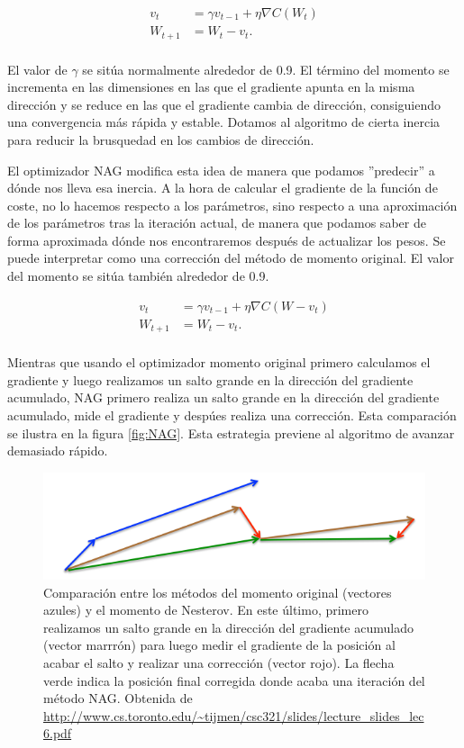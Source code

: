 \begin{align*}	
	v_t&= \gamma v_{t-1} + \eta \nabla C(W_t) \\
	W_{t+1} &= W_t- v_t. \\
\end{align*}

El valor de $\gamma$ se sitúa normalmente alrededor de 0.9. El término del momento se incrementa en las dimensiones en las que el gradiente apunta en la misma dirección y se reduce en las que el gradiente cambia de dirección, consiguiendo una convergencia más rápida y estable. Dotamos al algoritmo de cierta inercia para reducir la brusquedad en los cambios de dirección.

El optimizador NAG \cite{Nesterov} modifica esta idea de manera que podamos ''predecir'' a dónde nos lleva esa inercia. A la hora de calcular el gradiente de la función de coste, no lo hacemos respecto a los parámetros, sino respecto a una aproximación de los parámetros tras la iteración actual, de manera que podamos saber de forma aproximada dónde nos encontraremos después de actualizar los pesos. Se puede interpretar como una corrección del método de momento original. El valor del momento se sitúa también alrededor de 0.9.

\begin{align*}	
	v_t&= \gamma v_{t-1} + \eta \nabla C(W-v_t) \\
	W_{t+1} &= W_t - v_t. \\
\end{align*}

Mientras que usando el optimizador momento original primero calculamos el gradiente y luego realizamos un salto grande en la dirección del gradiente acumulado, NAG primero realiza un salto grande en la dirección del gradiente acumulado, mide el gradiente y despúes realiza una corrección. Esta comparación se ilustra en la figura \ref{fig:NAG}. Esta estrategia previene al algoritmo de avanzar demasiado rápido. 

\begin{figure}
    \centering
    \includegraphics[width=0.75\linewidth]{Plantilla_TFG_latex//imagenes//Inf//2.Fund/NAG.png}
    \caption{Comparación entre los métodos del momento original (vectores azules) y el momento de Nesterov. En este último, primero realizamos un salto grande en la dirección del gradiente acumulado (vector marrrón) para luego medir el gradiente de la posición al acabar el salto y realizar una corrección (vector rojo). La flecha verde indica la posición final corregida donde acaba una iteración del método NAG. Obtenida de \url{http://www.cs.toronto.edu/~tijmen/csc321/slides/lecture_slides_lec6.pdf}}
    \label{fig:resblock1x1}
\end{figure}



